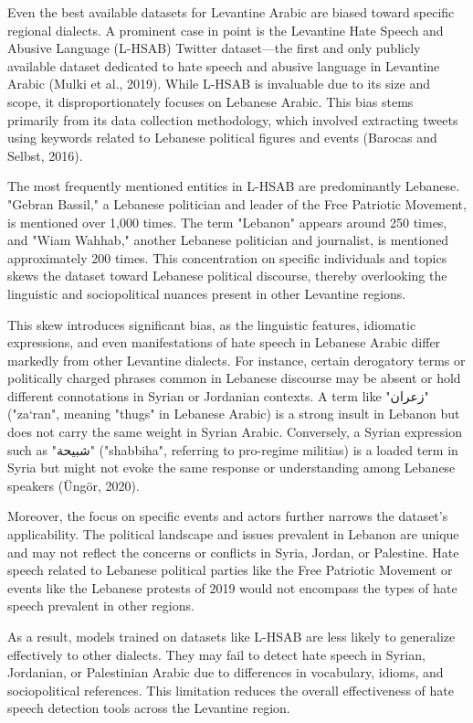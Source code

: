 \documentclass[11pt]{article}
\begin{document}
Even the best available datasets for Levantine Arabic are biased toward specific regional dialects. A prominent case in point is the Levantine Hate Speech and Abusive Language (L-HSAB) Twitter dataset—the first and only publicly available dataset dedicated to hate speech and abusive language in Levantine Arabic (Mulki et al., 2019). While L-HSAB is invaluable due to its size and scope, it disproportionately focuses on Lebanese Arabic. This bias stems primarily from its data collection methodology, which involved extracting tweets using keywords related to Lebanese political figures and events (Barocas and Selbst, 2016).

The most frequently mentioned entities in L-HSAB are predominantly Lebanese. "Gebran Bassil," a Lebanese politician and leader of the Free Patriotic Movement, is mentioned over 1,000 times. The term "Lebanon" appears around 250 times, and "Wiam Wahhab," another Lebanese politician and journalist, is mentioned approximately 200 times. This concentration on specific individuals and topics skews the dataset toward Lebanese political discourse, thereby overlooking the linguistic and sociopolitical nuances present in other Levantine regions.

This skew introduces significant bias, as the linguistic features, idiomatic expressions, and even manifestations of hate speech in Lebanese Arabic differ markedly from other Levantine dialects. For instance, certain derogatory terms or politically charged phrases common in Lebanese discourse may be absent or hold different connotations in Syrian or Jordanian contexts. A term like "زعران" ("za‘ran", meaning "thugs" in Lebanese Arabic) is a strong insult in Lebanon but does not carry the same weight in Syrian Arabic. Conversely, a Syrian expression such as "شبيحة" ("shabbiha", referring to pro-regime militias) is a loaded term in Syria but might not evoke the same response or understanding among Lebanese speakers (Üngör, 2020). 

Moreover, the focus on specific events and actors further narrows the dataset's applicability. The political landscape and issues prevalent in Lebanon are unique and may not reflect the concerns or conflicts in Syria, Jordan, or Palestine. Hate speech related to Lebanese political parties like the Free Patriotic Movement or events like the Lebanese protests of 2019 would not encompass the types of hate speech prevalent in other regions.

As a result, models trained on datasets like L-HSAB are less likely to generalize effectively to other dialects. They may fail to detect hate speech in Syrian, Jordanian, or Palestinian Arabic due to differences in vocabulary, idioms, and sociopolitical references. This limitation reduces the overall effectiveness of hate speech detection tools across the Levantine region.
\end{document}
